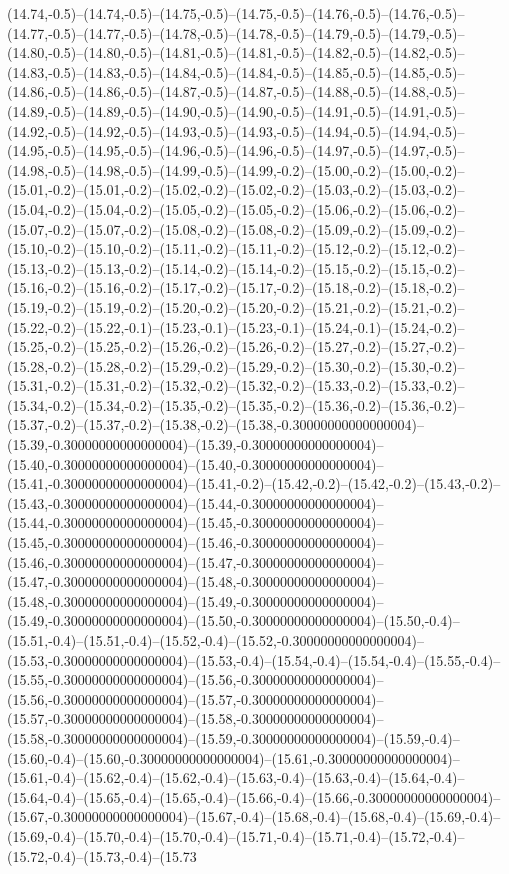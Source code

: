 (14.74,-0.5)--(14.74,-0.5)--(14.75,-0.5)--(14.75,-0.5)--(14.76,-0.5)--(14.76,-0.5)--(14.77,-0.5)--(14.77,-0.5)--(14.78,-0.5)--(14.78,-0.5)--(14.79,-0.5)--(14.79,-0.5)--(14.80,-0.5)--(14.80,-0.5)--(14.81,-0.5)--(14.81,-0.5)--(14.82,-0.5)--(14.82,-0.5)--(14.83,-0.5)--(14.83,-0.5)--(14.84,-0.5)--(14.84,-0.5)--(14.85,-0.5)--(14.85,-0.5)--(14.86,-0.5)--(14.86,-0.5)--(14.87,-0.5)--(14.87,-0.5)--(14.88,-0.5)--(14.88,-0.5)--(14.89,-0.5)--(14.89,-0.5)--(14.90,-0.5)--(14.90,-0.5)--(14.91,-0.5)--(14.91,-0.5)--(14.92,-0.5)--(14.92,-0.5)--(14.93,-0.5)--(14.93,-0.5)--(14.94,-0.5)--(14.94,-0.5)--(14.95,-0.5)--(14.95,-0.5)--(14.96,-0.5)--(14.96,-0.5)--(14.97,-0.5)--(14.97,-0.5)--(14.98,-0.5)--(14.98,-0.5)--(14.99,-0.5)--(14.99,-0.2)--(15.00,-0.2)--(15.00,-0.2)--(15.01,-0.2)--(15.01,-0.2)--(15.02,-0.2)--(15.02,-0.2)--(15.03,-0.2)--(15.03,-0.2)--(15.04,-0.2)--(15.04,-0.2)--(15.05,-0.2)--(15.05,-0.2)--(15.06,-0.2)--(15.06,-0.2)--(15.07,-0.2)--(15.07,-0.2)--(15.08,-0.2)--(15.08,-0.2)--(15.09,-0.2)--(15.09,-0.2)--(15.10,-0.2)--(15.10,-0.2)--(15.11,-0.2)--(15.11,-0.2)--(15.12,-0.2)--(15.12,-0.2)--(15.13,-0.2)--(15.13,-0.2)--(15.14,-0.2)--(15.14,-0.2)--(15.15,-0.2)--(15.15,-0.2)--(15.16,-0.2)--(15.16,-0.2)--(15.17,-0.2)--(15.17,-0.2)--(15.18,-0.2)--(15.18,-0.2)--(15.19,-0.2)--(15.19,-0.2)--(15.20,-0.2)--(15.20,-0.2)--(15.21,-0.2)--(15.21,-0.2)--(15.22,-0.2)--(15.22,-0.1)--(15.23,-0.1)--(15.23,-0.1)--(15.24,-0.1)--(15.24,-0.2)--(15.25,-0.2)--(15.25,-0.2)--(15.26,-0.2)--(15.26,-0.2)--(15.27,-0.2)--(15.27,-0.2)--(15.28,-0.2)--(15.28,-0.2)--(15.29,-0.2)--(15.29,-0.2)--(15.30,-0.2)--(15.30,-0.2)--(15.31,-0.2)--(15.31,-0.2)--(15.32,-0.2)--(15.32,-0.2)--(15.33,-0.2)--(15.33,-0.2)--(15.34,-0.2)--(15.34,-0.2)--(15.35,-0.2)--(15.35,-0.2)--(15.36,-0.2)--(15.36,-0.2)--(15.37,-0.2)--(15.37,-0.2)--(15.38,-0.2)--(15.38,-0.30000000000000004)--(15.39,-0.30000000000000004)--(15.39,-0.30000000000000004)--(15.40,-0.30000000000000004)--(15.40,-0.30000000000000004)--(15.41,-0.30000000000000004)--(15.41,-0.2)--(15.42,-0.2)--(15.42,-0.2)--(15.43,-0.2)--(15.43,-0.30000000000000004)--(15.44,-0.30000000000000004)--(15.44,-0.30000000000000004)--(15.45,-0.30000000000000004)--(15.45,-0.30000000000000004)--(15.46,-0.30000000000000004)--(15.46,-0.30000000000000004)--(15.47,-0.30000000000000004)--(15.47,-0.30000000000000004)--(15.48,-0.30000000000000004)--(15.48,-0.30000000000000004)--(15.49,-0.30000000000000004)--(15.49,-0.30000000000000004)--(15.50,-0.30000000000000004)--(15.50,-0.4)--(15.51,-0.4)--(15.51,-0.4)--(15.52,-0.4)--(15.52,-0.30000000000000004)--(15.53,-0.30000000000000004)--(15.53,-0.4)--(15.54,-0.4)--(15.54,-0.4)--(15.55,-0.4)--(15.55,-0.30000000000000004)--(15.56,-0.30000000000000004)--(15.56,-0.30000000000000004)--(15.57,-0.30000000000000004)--(15.57,-0.30000000000000004)--(15.58,-0.30000000000000004)--(15.58,-0.30000000000000004)--(15.59,-0.30000000000000004)--(15.59,-0.4)--(15.60,-0.4)--(15.60,-0.30000000000000004)--(15.61,-0.30000000000000004)--(15.61,-0.4)--(15.62,-0.4)--(15.62,-0.4)--(15.63,-0.4)--(15.63,-0.4)--(15.64,-0.4)--(15.64,-0.4)--(15.65,-0.4)--(15.65,-0.4)--(15.66,-0.4)--(15.66,-0.30000000000000004)--(15.67,-0.30000000000000004)--(15.67,-0.4)--(15.68,-0.4)--(15.68,-0.4)--(15.69,-0.4)--(15.69,-0.4)--(15.70,-0.4)--(15.70,-0.4)--(15.71,-0.4)--(15.71,-0.4)--(15.72,-0.4)--(15.72,-0.4)--(15.73,-0.4)--(15.73